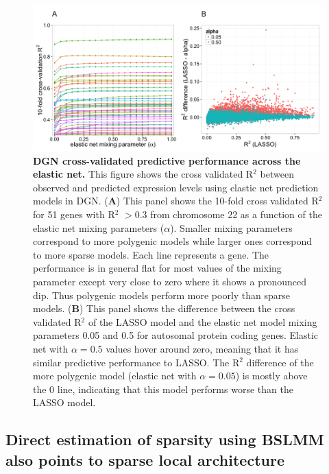 \documentclass[10pt,letterpaper]{article}
\begin{document}
\begin{figure}[H]
\includegraphics[width=12cm]{Figures/Fig-DGN-EN.png}
\caption{{\bf DGN cross-validated predictive performance across the elastic net.} 
This figure shows the cross validated R$^2$ between observed and predicted expression levels using elastic net prediction models in DGN. (\textbf{A}) This panel shows the 10-fold cross validated R$^2$ for 51 genes with R$^2$ $>0.3$ from chromosome 22 as a function of the elastic net mixing parameters (\(\alpha\)). Smaller mixing parameters correspond to more polygenic models while larger ones correspond to more sparse models. Each line represents a gene. The performance is in general flat for most values of the mixing parameter except very close to zero where it shows a pronounced dip. Thus polygenic models perform more poorly than sparse models. (\textbf{B}) This panel shows the difference between the cross validated R$^2$ of the LASSO model and the elastic net model mixing parameters 0.05 and 0.5 for autosomal protein coding genes. Elastic net with $\alpha=0.5$ values hover around zero, meaning that it has similar predictive performance to LASSO. The R$^2$ difference of the more polygenic model (elastic net with $\alpha=0.05$) is mostly above the 0 line, indicating that this model performs worse than the LASSO model.
%
}
\label{fig-dgn-en}
\end{figure}

\subsection*{Direct estimation of sparsity using BSLMM also points to sparse local architecture}
\end{document}
